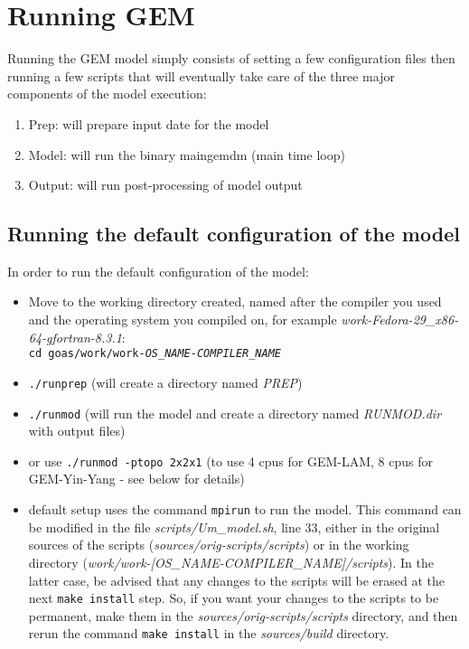 \documentclass[11pt]{book}
\begin{document}
\chapter{Running GEM}

Running the GEM model simply consists of setting a few configuration files
then running a few scripts that will eventually take care of the three major
components of the model execution: 

\begin{enumerate} 
\item Prep: 	will prepare input date for the model
\item Model: 	will run the binary maingemdm (main time loop)
\item Output: 	will run post-processing of model output
\end{enumerate} 

\section{Running the default configuration of the model}
\label{running-gem}

In order to run the default configuration of the model:

\begin{itemize}
\item Move to the working directory created, named after the compiler you
  used and the operating system you compiled on, for example
  \textit{work-Fedora-29\_x86-64-gfortran-8.3.1}: \\ 
\texttt{cd goas/work/work-\textit{OS\_NAME-COMPILER\_NAME}}
\item \texttt{./runprep} (will create a directory named \textit{PREP})
\item \texttt{./runmod} (will run the model and create a directory named
  \textit{RUNMOD.dir} with output files)
\item or use \texttt{./runmod -ptopo 2x2x1} (to use 4 cpus for GEM-LAM,
  8 cpus for GEM-Yin-Yang - see below for details)

\item default setup uses the command \texttt{mpirun} to run the model. This
  command can be modified in the file \textit{scripts/Um\_model.sh}, line
  33, either in the original sources of the scripts
  (\textit{sources/orig-scripts/scripts}) or in the working directory
  (\textit{work/work-[OS\_NAME-COMPILER\_NAME]/scripts}). In the latter
  case, be advised that any changes to the scripts will be erased at the
  next \texttt{make install} step. So, if you want your changes to the
  scripts to be permanent, make them in the
  \textit{sources/orig-scripts/scripts} directory, and then rerun the
  command \texttt{make install} in the \textit{sources/build} directory.
 
\end{itemize}
\end{document}
